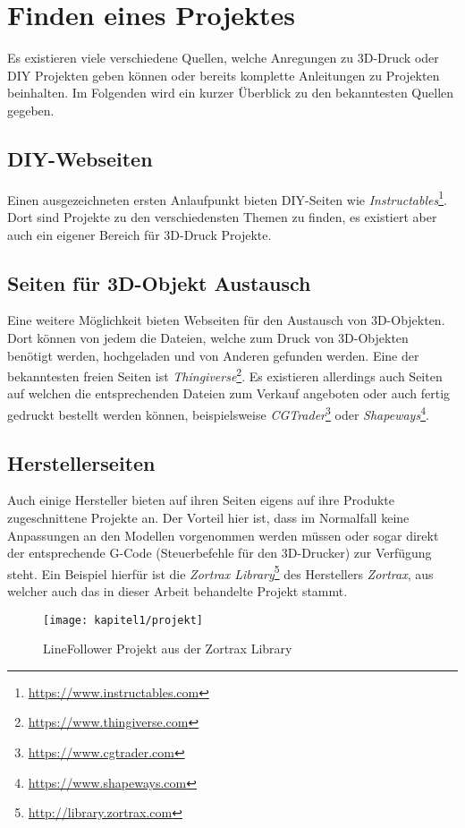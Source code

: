 \chapter{Finden eines Projektes}
Es existieren viele verschiedene Quellen, welche Anregungen zu 3D-Druck oder \ac{DIY} Projekten geben können oder bereits komplette Anleitungen zu Projekten beinhalten. Im Folgenden wird ein kurzer Überblick zu den bekanntesten Quellen gegeben.

\section{DIY-Webseiten}
Einen ausgezeichneten ersten Anlaufpunkt bieten \ac{DIY}-Seiten wie \textit{Instructables}\footnote{\url{https://www.instructables.com}}. Dort sind Projekte zu den verschiedensten Themen zu finden, es existiert aber auch ein eigener Bereich für 3D-Druck Projekte.

\section{Seiten für 3D-Objekt Austausch}
Eine weitere Möglichkeit bieten Webseiten für den Austausch von 3D-Objekten. Dort können von jedem die Dateien, welche zum Druck von 3D-Objekten benötigt werden, hochgeladen und von Anderen gefunden werden. Eine der bekanntesten freien Seiten ist \textit{Thingiverse}\footnote{\url{https://www.thingiverse.com}}. Es existieren allerdings auch Seiten auf welchen die entsprechenden Dateien zum Verkauf angeboten oder auch fertig gedruckt bestellt werden können, beispielsweise \textit{CGTrader}\footnote{\url{https://www.cgtrader.com}} oder \textit{Shapeways}\footnote{\url{https://www.shapeways.com}}.

\section{Herstellerseiten}
Auch einige Hersteller bieten auf ihren Seiten eigens auf ihre Produkte zugeschnittene Projekte an. Der Vorteil hier ist, dass im Normalfall keine Anpassungen an den Modellen vorgenommen werden müssen oder sogar direkt der entsprechende G-Code (Steuerbefehle für den 3D-Drucker) zur Verfügung steht. Ein Beispiel hierfür ist die \textit{Zortrax Library}\footnote{\url{http://library.zortrax.com}} des Herstellers \textit{Zortrax}, aus welcher auch das in dieser Arbeit behandelte Projekt stammt.

\begin{figure}[h]
  \centering
  \texttt{[image: kapitel1/projekt]}
  \caption{LineFollower Projekt aus der Zortrax Library}
  \label{Kap1:Projekt}
\end{figure}

